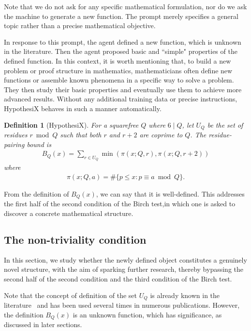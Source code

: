 \documentclass[11pt,reqno]{amsart}
\theoremstyle{plain}\newtheorem{theorem}{Theorem}[section]
\newtheorem{definition}{Definition}[section]
\numberwithin{equation}{section}
\begin{document}
\medskip
Note that we do not ask for any specific mathematical formulation, nor do we ask the machine to generate a new function. The prompt merely specifies a general topic rather than a precise mathematical objective.

In response to this prompt, the agent defined a new function, which is unknown in the literature. Then the agent proposed basic and ``simple" properties of the defined function. In this context, it is worth mentioning that, to build a new problem or proof structure in mathematics, mathematicians often define new functions or assemble known phenomena in a specific way to solve a problem. They then study their basic properties and eventually use them to achieve more advanced results. Without any additional training data or precise instructions, HypothesiX behaves in such a manner automatically.

\begin{definition}[HypothesiX]\label{bqdefinitionst}
For a squarefree $Q$ where $6 \mid Q$, let $U_Q$ be the set of residues $r\bmod Q$ such that both $r$ and $r+2$ are coprime to $Q$. The residue-pairing bound is
\begin{align}\label{bqdefinition}
B_Q(x)=\sum_{r \in U_Q} \min\left( \pi(x; Q, r), \pi(x; Q, r+2) \right)    
\end{align}
where 
\begin{align*}
\pi(x; Q, a)
=\#\{p\leq x:p\equiv a \bmod Q\}.
\end{align*}  
\end{definition}
\noindent
From the definition of $B_Q(x)$, we can say that it is well-defined. This addresses the first half of the second condition of the Birch test,in which one is asked to discover a concrete mathematical structure.

\subsection{The non-triviality condition}

In this section, we study whether the newly defined object constitutes a genuinely novel structure, with the aim of sparking further research, thereby bypassing the second half of the second condition and the third condition of the Birch test.

Note that the concept of definition of the set $U_Q$ is already known in the literature~\cite[\S9]{HalberstamRichert} and has been used several times in numerous publications. However, the definition $B_Q(x)$ is an unknown function, which has significance, as discussed in later sections.
\end{document}
